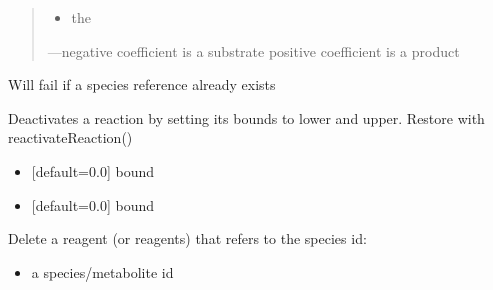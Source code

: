 \documentclass[letterpaper,10pt,english]{sphinxmanual}
\begin{document}
\begin{fulllineitems}
\begin{fulllineitems}
\begin{quote}
\begin{itemize}
\item {} 
\sphinxAtStartPar
{} the

\end{itemize}

\begin{flushright}
---negative coefficient is a substrate
\textendash{} positive coefficient is a product
\end{flushright}
\end{quote}

\sphinxAtStartPar
Will fail if a species reference already exists

\end{fulllineitems}


\begin{fulllineitems}
\label{\detokenize{modules_doc:cbmpy.CBModel.Reaction.deactivateReaction}}
\pysigstartsignatures
{}
\pysigstopsignatures
\sphinxAtStartPar
Deactivates a reaction by setting its bounds to lower and upper. Restore with reactivateReaction()
\begin{itemize}
\item {} 
\sphinxAtStartPar
{} {[}default=0.0{]} bound

\item {} 
\sphinxAtStartPar
{} {[}default=0.0{]} bound

\end{itemize}

\end{fulllineitems}


\begin{fulllineitems}
\label{\detokenize{modules_doc:cbmpy.CBModel.Reaction.deleteReagentWithSpeciesRef}}
\pysigstartsignatures
{}
\pysigstopsignatures
\sphinxAtStartPar
Delete a reagent (or reagents) that refers to the species id:
\begin{itemize}
\item {} 
\sphinxAtStartPar
{} a species/metabolite id


\end{itemize}
\end{fulllineitems}
\end{fulllineitems}
\end{document}
